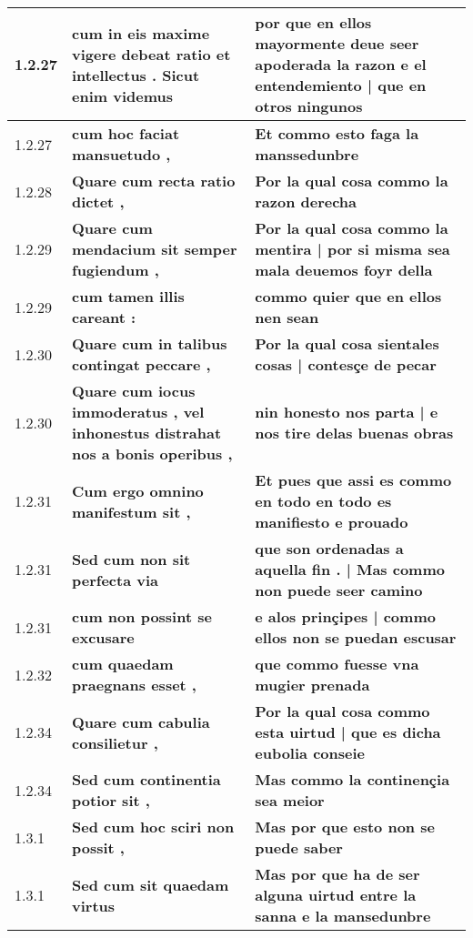 \begin{tabular}{|p{1cm}|p{6.5cm}|p{6.5cm}|}
1.2.27 &  \textbf{ cum in eis maxime vigere debeat ratio et intellectus . Sicut enim videmus }  &  \textbf{ por que en ellos mayormente deue seer apoderada la razon e el entendemiento | que en otros ningunos }  \\\hline
1.2.27 &  \textbf{ cum hoc faciat mansuetudo , }  &  \textbf{ Et commo esto faga la manssedunbre }  \\\hline
1.2.28 &  \textbf{ Quare cum recta ratio dictet , }  &  \textbf{ Por la qual cosa commo la razon derecha }  \\\hline
1.2.29 &  \textbf{ Quare cum mendacium sit semper fugiendum , }  &  \textbf{ Por la qual cosa commo la mentira | por si misma sea mala deuemos foyr della }  \\\hline
1.2.29 &  \textbf{ cum tamen illis careant : }  &  \textbf{ commo quier que en ellos nen sean }  \\\hline
1.2.30 &  \textbf{ Quare cum in talibus contingat peccare , }  &  \textbf{ Por la qual cosa sientales cosas | contesçe de pecar }  \\\hline
1.2.30 &  \textbf{ Quare cum iocus immoderatus , vel inhonestus distrahat nos a bonis operibus , }  &  \textbf{ nin honesto nos parta | e nos tire delas buenas obras }  \\\hline
1.2.31 &  \textbf{ Cum ergo omnino manifestum sit , }  &  \textbf{ Et pues que assi es commo en todo en todo es manifiesto e prouado }  \\\hline
1.2.31 &  \textbf{ Sed cum non sit perfecta via }  &  \textbf{ que son ordenadas a aquella fin . | Mas commo non puede seer camino }  \\\hline
1.2.31 &  \textbf{ cum non possint se excusare }  &  \textbf{ e alos prinçipes | commo ellos non se puedan escusar }  \\\hline
1.2.32 &  \textbf{ cum quaedam praegnans esset , }  &  \textbf{ que commo fuesse vna mugier prenada }  \\\hline
1.2.34 &  \textbf{ Quare cum cabulia consilietur , }  &  \textbf{ Por la qual cosa commo esta uirtud | que es dicha eubolia conseie }  \\\hline
1.2.34 &  \textbf{ Sed cum continentia potior sit , }  &  \textbf{ Mas commo la continençia sea meior }  \\\hline
1.3.1 &  \textbf{ Sed cum hoc sciri non possit , }  &  \textbf{ Mas por que esto non se puede saber }  \\\hline
1.3.1 &  \textbf{ Sed cum sit quaedam virtus }  &  \textbf{ Mas por que ha de ser alguna uirtud entre la sanna e la mansedunbre }  \\\hline

\end{tabular}
